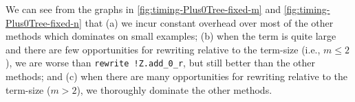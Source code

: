 \documentclass[sigplan,10pt,review,anonymous]{acmart}\settopmatter{printfolios=true,printccs=false,printacmref=false}
\begin{document}
We can see from the graphs in \autoref{fig:timing-Plus0Tree-fixed-m} and \autoref{fig:timing-Plus0Tree-fixed-n} that
(a) we incur constant overhead over most of the other methods which dominates on small examples;
(b) when the term is quite large and there are few opportunities for rewriting relative to the term-size (i.e., $m \le 2$), we are worse than \texttt{rewrite !Z.add_0_r}, but still better than the other methods; and
(c) when there are many opportunities for rewriting relative to the term-size ($m > 2$), we thoroughly dominate the other methods.

\end{document}
